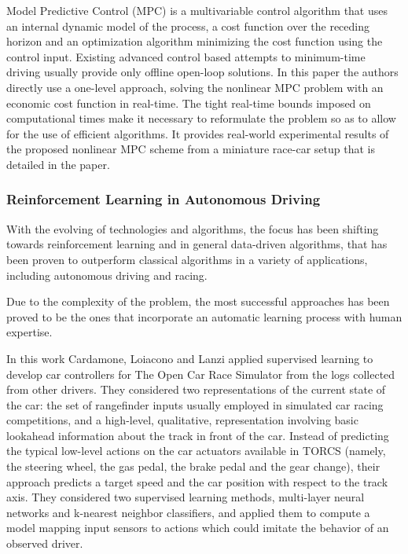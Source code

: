 Model Predictive Control (MPC) is a multivariable control algorithm that uses an internal dynamic model of the process, a cost function over the receding horizon and an optimization algorithm minimizing the cost function using the control input. Existing advanced control based attempts to minimum-time driving usually provide only offline open-loop solutions. In this paper \cite{mpc} the authors directly use a one-level approach, solving the nonlinear MPC problem with an economic cost function in real-time. The tight real-time bounds imposed on computational times make it necessary to reformulate the problem so as to allow for the use of efficient algorithms.
It provides real-world experimental results of the proposed nonlinear MPC scheme from a miniature race-car setup that is detailed in the paper. 

\subsubsection{Reinforcement Learning in Autonomous Driving}

With the evolving of technologies and algorithms, the focus has been shifting towards reinforcement learning and in general data-driven algorithms, that has been proven to outperform classical algorithms in a variety of applications, including autonomous driving and racing.

Due to the complexity of the problem, the most successful approaches has been proved to be the ones that incorporate an automatic learning process with human expertise.

In this work \cite{cardamone} Cardamone, Loiacono and Lanzi applied supervised learning to develop car controllers for The Open Car Race Simulator from the logs collected from other drivers. 
They considered two representations of the current state of the car: the set of rangefinder inputs usually employed in simulated car racing competitions, and a high-level, qualitative, representation involving basic lookahead information about the track in front of the car. Instead of predicting the typical low-level actions on the car actuators available in TORCS (namely, the steering wheel, the gas pedal, the brake pedal and the gear change), their approach predicts a target speed and the car position with respect to the track axis.
They considered two supervised learning methods, multi-layer neural networks and k-nearest neighbor classifiers, and applied them to compute a model mapping input sensors to actions which could imitate the behavior of an observed driver.

